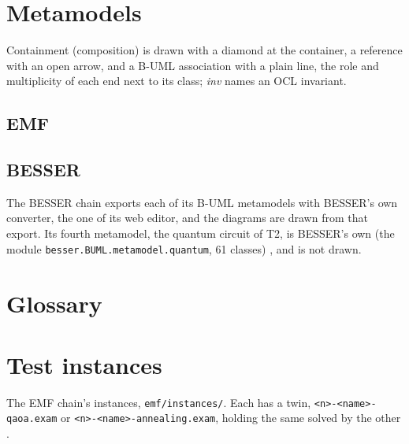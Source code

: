 \documentclass{article}
\begin{document}




\section{Metamodels}\label{app:metamodels}

Containment (composition) is drawn with a diamond at the container, a reference with an open arrow, and a B-UML
association with a plain line, the role and multiplicity of each end next to its class; \textit{inv} names an
OCL invariant.

\subsection{EMF}\label{app:metamodels-emf}






\subsection{BESSER}\label{app:metamodels-besser}

The BESSER chain exports each of its B-UML metamodels with BESSER's own converter, the one of its web editor, and
the diagrams are drawn from that export. Its fourth metamodel, the quantum circuit of T2, is BESSER's own
(the module \texttt{besser.BUML.metamodel.quantum}, 61 classes) \cite{BESSER}, and is not drawn.





\section{Glossary}\label{app:glossary}



\section{Test instances}\label{app:instances}

The EMF chain's instances, \texttt{emf/instances/}. Each has a twin, \texttt{<n>-<name>-qaoa.exam} or
\texttt{<n>-<name>-annealing.exam}, holding the same  solved by the other .
\end{document}
